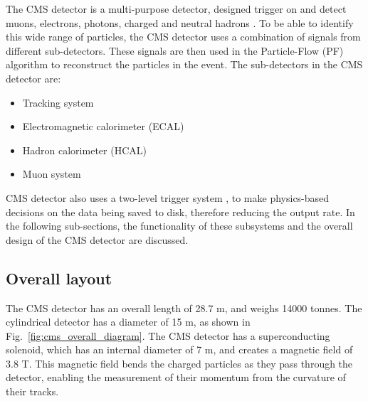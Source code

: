 The CMS detector is a multi-purpose detector, designed trigger on \cite{cms:l1_paper,cms:hlt_paper} and detect muons, electrons, photons, charged and 
neutral hadrons \cite{cms:elepho_paper,cms:muon_paper,cms:vertex_paper}. To be able to identify this wide range of particles, the CMS detector uses a combination of signals from different sub-detectors. These signals
are then used in the Particle-Flow (PF) algorithm to reconstruct the particles in the event. The sub-detectors in the CMS detector are:

\begin{itemize}
    \item Tracking system
    \item Electromagnetic calorimeter (ECAL)
    \item Hadron calorimeter (HCAL)
    \item Muon system
\end{itemize}

CMS detector also uses a two-level trigger system \cite{cms:l1_paper,cms:hlt_paper}, to make physics-based decisions on the data being saved to disk, 
therefore reducing the output rate. In the following sub-sections, the functionality of these subsystems and the overall design of the CMS detector are discussed.

\subsection{Overall layout}

The CMS detector has an overall length of 28.7 m, and weighs 14000 tonnes. The cylindrical detector
has a diameter of 15 m, as shown in Fig.~\ref{fig:cms_overall_diagram}. The CMS detector has a superconducting solenoid,
which has an internal diameter of 7 m, and creates a magnetic field of 3.8 T. This magnetic field bends the charged particles
as they pass through the detector, enabling the measurement of their momentum from the curvature of their tracks.


